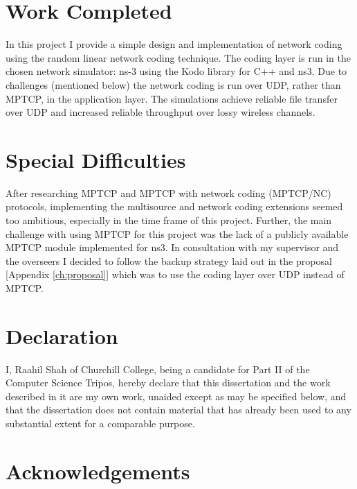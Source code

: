 \documentclass[12pt,a4paper,twoside,openright]{report}
\begin{document}
\section*{Work Completed}

In this project I provide a simple design and implementation of network coding using the random linear network coding technique. The coding layer is run in the chosen network simulator: ns-3 using the Kodo library for C++ and ns3. Due to challenges (mentioned below) the network coding is run over UDP, rather than MPTCP, in the application layer. The simulations achieve reliable file transfer over UDP and increased reliable throughput over lossy wireless channels.


\section*{Special Difficulties}

After researching MPTCP and MPTCP with network coding (MPTCP/NC) protocols, implementing the multisource and network coding extensions seemed too ambitious, especially in the time frame of this project. Further, the main challenge with using MPTCP for this project was the lack of a publicly available MPTCP module implemented for ns3. In consultation with my supervisor and the overseers I decided to follow the backup strategy laid out in the proposal [Appendix \ref{ch:proposal}] which was to use the coding layer over UDP instead of MPTCP. 
 
\newpage
\section*{Declaration}

I, Raahil Shah of Churchill College, being a candidate for Part II of the Computer
Science Tripos, hereby declare
that this dissertation and the work described in it are my own work,
unaided except as may be specified below, and that the dissertation
does not contain material that has already been used to any substantial
extent for a comparable purpose.

\bigskip
{}

\medskip
{}

\tableofcontents

\listoffigures

\newpage
\section*{Acknowledgements}
\end{document}
